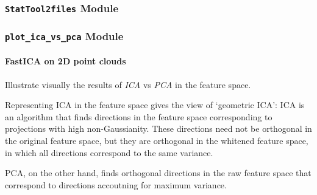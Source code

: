 \documentclass[letterpaper,10pt,english]{sphinxmanual}
\begin{document}
\begin{fulllineitems}
\label{SamPy.statistics:SamPy.statistics.StatTool.process_args}
\end{fulllineitems}



\subsubsection{\texttt{StatTool2files} Module}
\label{SamPy.statistics:module-SamPy.statistics.StatTool2files}\label{SamPy.statistics:stattool2files-module}

\begin{fulllineitems}
\label{SamPy.statistics:SamPy.statistics.StatTool2files.process_args}
\end{fulllineitems}



\subsubsection{\texttt{plot\_ica\_vs\_pca} Module}
\label{SamPy.statistics:module-SamPy.statistics.plot_ica_vs_pca}\label{SamPy.statistics:plot-ica-vs-pca-module}

\paragraph{FastICA on 2D point clouds}
\label{SamPy.statistics:fastica-on-2d-point-clouds}
Illustrate visually the results of \emph{ICA} vs \emph{PCA} in the
feature space.

Representing ICA in the feature space gives the view of `geometric ICA':
ICA is an algorithm that finds directions in the feature space
corresponding to projections with high non-Gaussianity. These directions
need not be orthogonal in the original feature space, but they are
orthogonal in the whitened feature space, in which all directions
correspond to the same variance.

PCA, on the other hand, finds orthogonal directions in the raw feature
space that correspond to directions accoutning for maximum variance.
\end{document}

